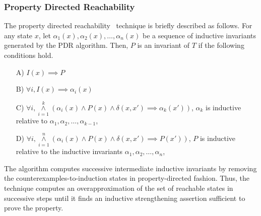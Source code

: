 \subsubsection{Property Directed Reachability} 
%
The property directed reachability~\cite{fmcad07} technique is briefly 
described as follows. 
% 
For any state $x$, let $\alpha_1(x), \alpha_2(x),\ldots,\alpha_n(x)$ be a 
sequence of inductive invariants generated by the PDR algorithm. Then, $P$ 
is an invariant of $T$ if the following conditions hold.
%
\begin{enumerate}
 \item [A)] $I(x) \implies P$
 \item [B)] $\forall i, I(x) \implies \alpha_i(x)$
 \item [C)] $\forall i, {\overset{k}{\underset{i=1}{\wedge}}} 
	 (\alpha_i(x) \wedge P(x) \wedge \delta(x,x') \implies \alpha_k(x'))$,
 $\alpha_k$ is inductive relative to $\alpha_1, \alpha_2,\ldots,\alpha_{k-1}$,
 \item [D)] $\forall i, {\overset{n}{\underset{i=1}{\wedge}}} 
	(\alpha_i(x) \wedge P(x) \wedge \delta(x,x') \implies P(x'))$, 
 $P$ is inductive relative to the inductive invariants $\alpha_1,\alpha_2,\ldots,\alpha_n$, 
\end{enumerate}
%  
The algorithm computes successive intermediate inductive invariants by 
removing the counterexamples-to-induction states in property-directed 
fashion.  Thus, the technique computes an overapproximation of the set of 
reachable states in successive steps until it finds an inductive 
strengthening assertion sufficient to prove the property. 


